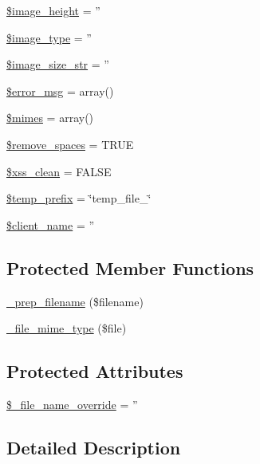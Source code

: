 \begin{DoxyCompactItemize}
\hyperlink{class_c_i___upload_af1b0485025a4c66fa3b2fc442df02d72}{\$image\-\_\-height} = ''
\item 
\hyperlink{class_c_i___upload_a939d6733d998cce893403d2f59f40317}{\$image\-\_\-type} = ''
\item 
\hyperlink{class_c_i___upload_a3a1769072af8ab3b0c5d6e0c1a1ae2ef}{\$image\-\_\-size\-\_\-str} = ''
\item 
\hyperlink{class_c_i___upload_acf910733622c1fa671b9f755c69c2ec7}{\$error\-\_\-msg} = array()
\item 
\hyperlink{class_c_i___upload_a2ce7d338d1fd0f0d971ba6213ac298a2}{\$mimes} = array()
\item 
\hyperlink{class_c_i___upload_ad9f32a52b4b2c16e42a007e0fa832721}{\$remove\-\_\-spaces} = T\-R\-U\-E
\item 
\hyperlink{class_c_i___upload_a0f2ee8861c0b3164a5c6e126dd98c0cc}{\$xss\-\_\-clean} = F\-A\-L\-S\-E
\item 
\hyperlink{class_c_i___upload_ab38888cba65ae75bbc5b3841bc69d64a}{\$temp\-\_\-prefix} = \char`\"{}temp\-\_\-file\-\_\-\char`\"{}
\item 
\hyperlink{class_c_i___upload_a3b81ba4d3535269e20e0b4a2ddab2edc}{\$client\-\_\-name} = ''
\end{DoxyCompactItemize}
\subsection*{Protected Member Functions}
\begin{DoxyCompactItemize}
\item 
\hyperlink{class_c_i___upload_a00936ce870d818794909bf16dc2ff70b}{\-\_\-prep\-\_\-filename} (\$filename)
\item 
\hyperlink{class_c_i___upload_a8ac4511eca70b271965b7f8ef00faf66}{\-\_\-file\-\_\-mime\-\_\-type} (\$file)
\end{DoxyCompactItemize}
\subsection*{Protected Attributes}
\begin{DoxyCompactItemize}
\item 
\hyperlink{class_c_i___upload_a9f09c7cb693d391de63f9c8e91f159e1}{\$\-\_\-file\-\_\-name\-\_\-override} = ''
\end{DoxyCompactItemize}


\subsection{Detailed Description}



